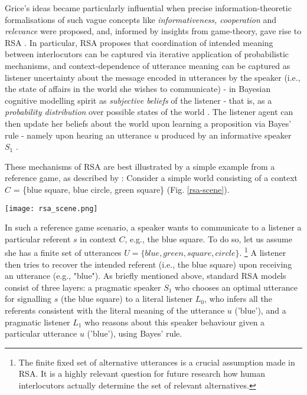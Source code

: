 Grice’s ideas became particularly influential when precise information-theoretic formalisations of such vague concepts like \emph{informativeness, cooperation} and \emph{relevance} were proposed, and, informed by insights from game-theory, gave rise to RSA \parencite{frank2012predicting}.
In particular, RSA proposes that coordination of intended meaning between interlocutors can be captured via iterative application of probabilistic mechanisms, and context-dependence of utterance meaning can be captured as listener uncertainty about the message encoded in utterances by the speaker (i.e., the state of affairs in the world she wishes to communicate) - in Bayesian cognitive modelling spirit as \emph{subjective beliefs} of the listener - that is, as a \emph{probability distribution} over possible states of the world \parencite{tenenbaum2011grow}. The listener agent can then update her beliefs about the world upon learning a proposition via Bayes' rule - namely upon hearing an utterance $u$ produced by an informative speaker $S_1$ \parencite{frank2012predicting}.

These mechanisms of RSA are best illustrated by a simple example from a reference game, as described by \textcite{frank2012predicting}:
Consider a simple world consisting of a context $C$ = \{blue square, blue circle, green square\} (Fig. \ref{rsa-scene}).
\begin{figure*}[t]
	\begin{center}
		\texttt{[image: rsa\_scene.png]}
	\end{center}
	\vspace{-0.3cm}
	\caption{A simple reference resolution example scenario: the context $C$ consists of three possible referents \parencite{frank2012predicting}}
	\label{rsa-scene}
\end{figure*}
In such a reference game scenario, a speaker wants to communicate to a listener a particular referent $s$ in context $C$, e.g., the blue square. To do so, let us assume she has a finite set of utterances $U = \{blue, green, square, circle\}$.  \footnote{The finite fixed set of alternative utterances is a crucial assumption made in RSA. It is a highly relevant question for future research how human interlocutors actually determine the set of relevant alternatives.} A listener then tries to recover the intended referent (i.e., the blue square) upon receiving an utterance (e.g., "blue"). 
As briefly mentioned above, standard RSA models consist of three layers: a pragmatic speaker $S_1$ who chooses an optimal utterance for signalling $s$ (the blue square) to a literal listener $L_0$, who infers all the referents consistent with the literal meaning of the utterance $u$ ('blue'), and a pragmatic listener $L_1$ who reasons about this speaker behaviour given a particular utterance $u$ ('blue'), using Bayes' rule.

